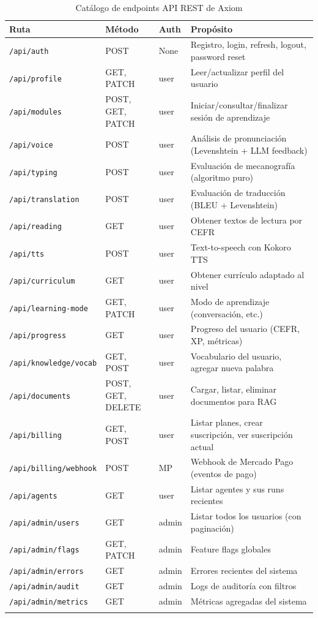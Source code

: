 \documentclass[10pt,a4paper,oneside]{report}
\begin{document}
\begin{longtable}{p{4cm}p{2cm}p{2.5cm}p{5cm}}
\toprule
\textbf{Ruta} & \textbf{Método} & \textbf{Auth} & \textbf{Propósito} \\
\midrule
\endhead
\texttt{/api/auth} & POST & None & Registro, login, refresh, logout, password reset \\
\texttt{/api/profile} & GET, PATCH & user & Leer/actualizar perfil del usuario \\
\texttt{/api/modules} & POST, GET, PATCH & user & Iniciar/consultar/finalizar sesión de aprendizaje \\
\texttt{/api/voice} & POST & user & Análisis de pronunciación (Levenshtein + LLM feedback) \\
\texttt{/api/typing} & POST & user & Evaluación de mecanografía (algoritmo puro) \\
\texttt{/api/translation} & POST & user & Evaluación de traducción (BLEU + Levenshtein) \\
\texttt{/api/reading} & GET & user & Obtener textos de lectura por CEFR \\
\texttt{/api/tts} & POST & user & Text-to-speech con Kokoro TTS \\
\texttt{/api/curriculum} & GET & user & Obtener currículo adaptado al nivel \\
\texttt{/api/learning-mode} & GET, PATCH & user & Modo de aprendizaje (conversación, etc.) \\
\texttt{/api/progress} & GET & user & Progreso del usuario (CEFR, XP, métricas) \\
\texttt{/api/knowledge/vocab} & GET, POST & user & Vocabulario del usuario, agregar nueva palabra \\
\texttt{/api/documents} & POST, GET, DELETE & user & Cargar, listar, eliminar documentos para RAG \\
\texttt{/api/billing} & GET, POST & user & Listar planes, crear suscripción, ver suscripción actual \\
\texttt{/api/billing/webhook} & POST & MP & Webhook de Mercado Pago (eventos de pago) \\
\texttt{/api/agents} & GET & user & Listar agentes y sus runs recientes \\
\texttt{/api/admin/users} & GET & admin & Listar todos los usuarios (con paginación) \\
\texttt{/api/admin/flags} & GET, PATCH & admin & Feature flags globales \\
\texttt{/api/admin/errors} & GET & admin & Errores recientes del sistema \\
\texttt{/api/admin/audit} & GET & admin & Logs de auditoría con filtros \\
\texttt{/api/admin/metrics} & GET & admin & Métricas agregadas del sistema \\
\bottomrule
\caption{Catálogo de endpoints API REST de Axiom}
\end{longtable}
\end{document}
